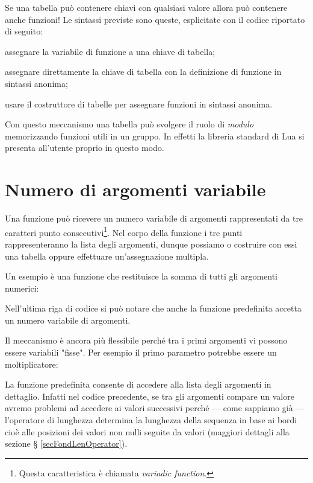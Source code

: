 Se una tabella può contenere chiavi con qualsiasi valore allora può contenere
anche funzioni! Le sintassi previste sono queste, esplicitate con il codice
riportato di seguito:
\begin{compactitemize}
\item assegnare la variabile di funzione a una chiave di tabella;
\item assegnare direttamente la chiave di tabella con la definizione di funzione
in sintassi anonima;
\item usare il costruttore di tabelle per assegnare funzioni in sintassi
anonima.
\end{compactitemize}

Con questo meccanismo una tabella può svolgere il ruolo di \emph{modulo}
memorizzando funzioni utili in un gruppo. In effetti la libreria standard
di Lua si presenta all'utente proprio in questo modo.


\section{Numero di argomenti variabile}

Una funzione può ricevere un numero variabile di argomenti rappresentati da
 tre caratteri punto consecutivi\footnote{Questa
caratteristica è chiamata \emph{variadic function}.}. Nel corpo della funzione i
tre punti rappresenteranno la lista degli argomenti, dunque possiamo o costruire
con essi una tabella oppure effettuare un'assegnazione multipla.

Un esempio è una funzione che restituisce la somma di tutti gli argomenti
numerici:

Nell'ultima riga di codice si può notare che anche la funzione predefinita
 accetta un numero variabile di argomenti.

Il meccanismo è ancora più flessibile perché tra i primi argomenti vi possono
essere variabili "fisse". Per esempio il primo parametro potrebbe essere un
moltiplicatore:


La funzione predefinita  consente di accedere alla
lista degli argomenti in dettaglio. Infatti nel codice precedente, se tra gli
argomenti compare un valore  avremo problemi ad accedere ai valori
successivi perché --- come sappiamo già --- l'operatore di lunghezza \key{\#}
determina la lunghezza della sequenza in base ai bordi cioè alle posizioni dei
valori non nulli seguite da valori  (maggiori dettagli alla sezione \S
\ref{secFondLenOperator}).

